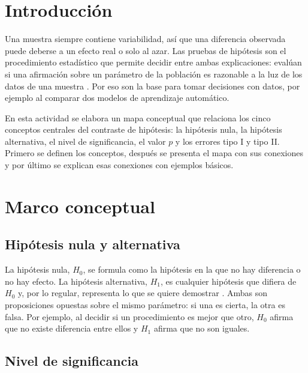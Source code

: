 \documentclass[11pt,letterpaper]{article}
\begin{document}
\portada
\indicegeneral


\section{Introducción}

Una muestra siempre contiene variabilidad, así que una diferencia observada puede deberse a un efecto real o solo al azar. Las pruebas de hipótesis son el procedimiento estadístico que permite decidir entre ambas explicaciones: evalúan si una afirmación sobre un parámetro de la población es razonable a la luz de los datos de una muestra \parencite{tecnm2026_documento_fuente}. Por eso son la base para tomar decisiones con datos, por ejemplo al comparar dos modelos de aprendizaje automático.

En esta actividad se elabora un mapa conceptual que relaciona los cinco conceptos centrales del contraste de hipótesis: la hipótesis nula, la hipótesis alternativa, el nivel de significancia, el valor $p$ y los errores tipo I y tipo II. Primero se definen los conceptos, después se presenta el mapa con sus conexiones y por último se explican esas conexiones con ejemplos básicos.

\section{Marco conceptual}

\subsection{Hipótesis nula y alternativa}

La hipótesis nula, $H_0$, se formula como la hipótesis en la que no hay diferencia o no hay efecto. La hipótesis alternativa, $H_1$, es cualquier hipótesis que difiera de $H_0$ y, por lo regular, representa lo que se quiere demostrar \parencite{tecnm2026_documento_fuente}. Ambas son proposiciones opuestas sobre el mismo parámetro: si una es cierta, la otra es falsa. Por ejemplo, al decidir si un procedimiento es mejor que otro, $H_0$ afirma que no existe diferencia entre ellos y $H_1$ afirma que no son iguales.

\subsection{Nivel de significancia}
\end{document}
